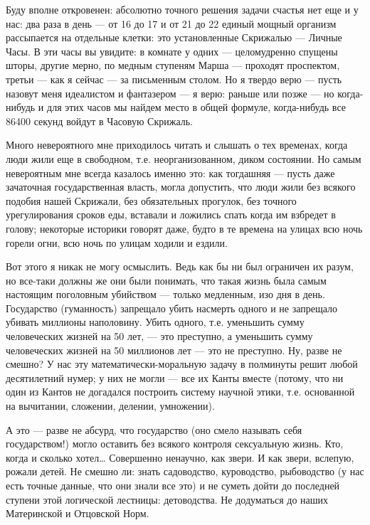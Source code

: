 \documentclass[11pt,openany]{book}
\begin{document}
Буду вполне откровенен: абсолютно точного решения задачи счастья нет еще и у нас: два раза в день --- от 16 до 17 и от 21 до 22 единый мощный организм рассыпается на отдельные клетки: это установленные Скрижалью --- Личные Часы. В эти часы вы увидите: в комнате у одних --- целомудренно спущены шторы, другие мерно, по медным ступеням Марша --- проходят проспектом, третьи --- как я сейчас --- за письменным столом. Но я твердо верю --- пусть назовут меня идеалистом и фантазером --- я верю: раньше или позже --- но когда-нибудь и для этих часов мы найдем место в общей формуле, когда-нибудь все 86400 секунд войдут в Часовую Скрижаль.

Много невероятного мне приходилось читать и слышать о тех временах, когда люди жили еще в свободном, т.е. неорганизованном, диком состоянии. Но самым невероятным мне всегда казалось именно это: как тогдашняя --- пусть даже зачаточная государственная власть, могла допустить, что люди жили без всякого подобия нашей Скрижали, без обязательных прогулок, без точного урегулирования сроков еды, вставали и ложились спать когда им взбредет в голову; некоторые историки говорят даже, будто в те времена на улицах всю ночь горели огни, всю ночь по улицам ходили и ездили.

Вот этого я никак не могу осмыслить. Ведь как бы ни был ограничен их разум, но все-таки должны же они были понимать, что такая жизнь была самым настоящим поголовным убийством --- только медленным, изо дня в день. Государство (гуманность) запрещало убить насмерть одного и не запрещало убивать миллионы наполовину. Убить одного, т.е. уменьшить сумму человеческих жизней на 50 лет, --- это преступно, а уменьшить сумму человеческих жизней на 50 миллионов лет --- это не преступно. Ну, разве не смешно? У нас эту математически-моральную задачу в полминуты решит любой десятилетний нумер; у них не могли --- все их Канты вместе (потому, что ни один из Кантов не догадался построить систему научной этики, т.е. основанной на вычитании, сложении, делении, умножении).

А это --- разве не абсурд, что государство (оно смело называть себя государством!) могло оставить без всякого контроля сексуальную жизнь. Кто, когда и сколько хотел\ldots{} Совершенно ненаучно, как звери. И как звери, вслепую, рожали детей. Не смешно ли: знать садоводство, куроводство, рыбоводство (у нас есть точные данные, что они знали все это) и не суметь дойти до последней ступени этой логической лестницы: детоводства. Не додуматься до наших Материнской и Отцовской Норм.
\end{document}
